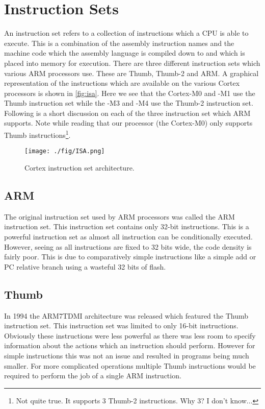 \chapter{Instruction Sets}
\label{sec:instruction_sets}
An instruction set refers to a collection of instructions which a CPU is able to execute. This is a combination of the assembly instruction names and the machine code which the assembly language is compiled down to and which is placed into memory for execution. There are three different instruction sets which various ARM processors use. These are Thumb, Thumb-2 and ARM. A graphical representation of the instructions which are available on the various Cortex processors is shown in \autoref{fig:isa}. Here we see that the Cortex-M0 and -M1 use the Thumb instruction set while the -M3 and -M4 use the Thumb-2 instruction set. Following is a short discussion on each of the three instruction set which ARM supports. Note while reading that our processor (the Cortex-M0) only supports Thumb instructions\footnote{Not quite true. It supports 3 Thumb-2 instructions. Why 3? I don't know...}.

\begin{figure}
  \centering
  \texttt{[image: ./fig/ISA.png]}
  \caption{Cortex instruction set architecture.}
  \label{fig:isa}
\end{figure}

\section{ARM}
The original instruction set used by ARM processors was called the ARM instruction set. This instruction set contains only 32-bit instructions. This is a powerful instruction set as almost all instruction can be conditionally executed. However, seeing as all instructions are fixed to 32 bits wide, the code density is fairly poor. This is due to comparatively simple instructions like a simple add or PC relative branch using a wasteful 32 bits of flash.

\section{Thumb}
In 1994 the ARM7TDMI architecture was released which featured the Thumb instruction set. This instruction set was limited to only 16-bit instructions. Obviously these instructions were less powerful as there was less room to specify information about the actions which an instruction should perform. However for simple instructions this was not an issue and resulted in programs being much smaller. For more complicated operations multiple Thumb instructions would be required to perform the job of a single ARM instruction. 

